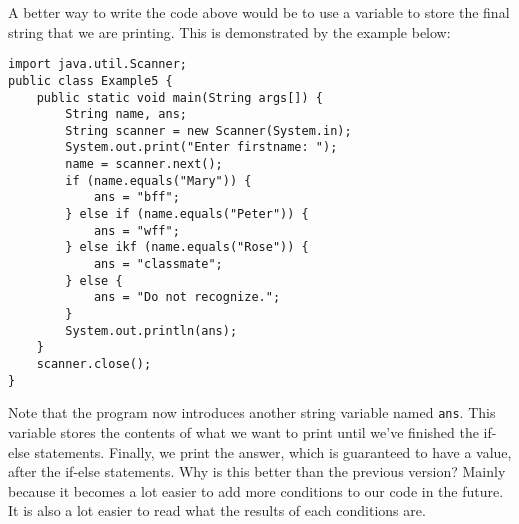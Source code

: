 A better way to write the code above would be to use a variable to store the final string that we are printing. This is demonstrated by the example below:

\begin{lstlisting}
import java.util.Scanner;
public class Example5 {
    public static void main(String args[]) {
        String name, ans;
        String scanner = new Scanner(System.in);
        System.out.print("Enter firstname: ");
        name = scanner.next();
        if (name.equals("Mary")) {
            ans = "bff";
        } else if (name.equals("Peter")) {
            ans = "wff";
        } else ikf (name.equals("Rose")) {
            ans = "classmate";
        } else {
            ans = "Do not recognize.";
        }
        System.out.println(ans);
    }
    scanner.close();
}
\end{lstlisting}

Note that the program now introduces another string variable named \verb!ans!. This variable stores the contents of what we want to print until we've finished the if-else statements. Finally, we print the answer, which is guaranteed to have a value, after the if-else statements. Why is this better than the previous version? Mainly because it becomes a lot easier to add more conditions to our code in the future. It is also a lot easier to read what the results of each conditions are. 

